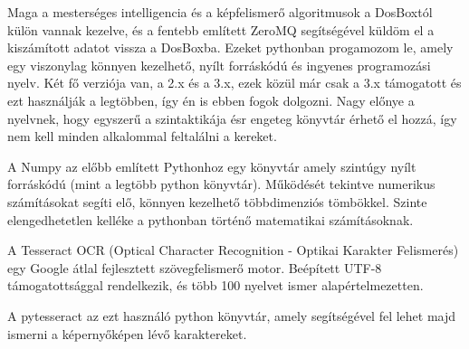 
Maga a mesterséges intelligencia és a képfelismerő algoritmusok a DosBoxtól külön vannak kezelve, és a fentebb említett ZeroMQ segítségével küldöm el a kiszámított adatot vissza a DosBoxba. Ezeket pythonban progamozom le, amely egy viszonylag könnyen kezelhető, nyílt forráskódú és ingyenes programozási nyelv. Két fő verziója van, a 2.x és a 3.x, ezek közül már csak a 3.x támogatott és ezt használják a legtöbben, így én is ebben fogok dolgozni. Nagy előnye a nyelvnek, hogy egyszerű a szintaktikája ésr engeteg könyvtár érhető el hozzá, így nem kell minden alkalommal feltalálni a kereket.


A Numpy{\cite{numpy}} az előbb említett Pythonhoz egy könyvtár amely szintúgy nyílt forráskódú (mint a legtöbb python könyvtár). Működését tekintve numerikus számításokat segíti elő, könnyen kezelhető többdimenziós tömbökkel. Szinte elengedhetetlen kelléke a pythonban történő matematikai számításoknak.


A Tesseract OCR{\cite{tesseract}} (Optical Character Recognition - Optikai Karakter Felismerés) egy Google átlal fejlesztett szövegfelismerő motor. Beépített UTF-8 támogatottsággal rendelkezik, és több 100 nyelvet ismer alapértelmezetten.

A pytesseract az ezt használó python könyvtár, amely segítségével fel lehet majd ismerni a képernyőképen lévő karaktereket.





